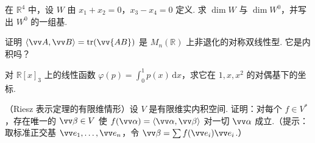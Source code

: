 {\begin{exA}
			\item\label{ex:bil:A12} 在 $\mathbb{R}^4$ 中，设 $W$ 由 $x_1+x_2=0$，$x_3-x_4=0$ 定义. 求 $\dim W$ 与 $\dim W^0$，并写出 $W^0$ 的一组基.
			\item\label{ex:bil:A13} 证明 $\langle\vv A,\vv B\rangle=\tr(\vv{AB})$ 是 $M_n(\mathbb{R})$ 上非退化的对称双线性型. 它是内积吗？
			\item\label{ex:bil:A14} 对 $\mathbb{R}[x]_3$ 上的线性函数 $\varphi(p)=\int_0^1p(x)\,\mathrm dx$，求它在 $1,x,x^2$ 的对偶基下的坐标.
			\item\label{ex:bil:A15} （Riesz 表示定理的有限维情形）设 $V$ 是有限维实内积空间. 证明：对每个 $f\in V^*$，存在唯一的 $\vv\beta\in V$ 使 $f(\vv\alpha)=\langle\vv\alpha,\vv\beta\rangle$ 对一切 $\vv\alpha$ 成立.（提示：取标准正交基 $\vv e_1,\ldots,\vv e_n$，令 $\vv\beta=\sum f(\vv e_i)\vv e_i$.）
		\end{exA}
		
}
